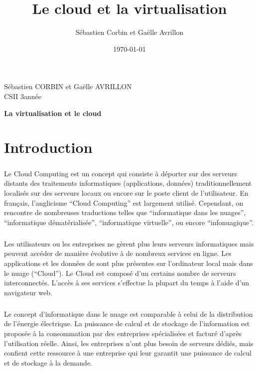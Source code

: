 \documentclass[a4paper,12pt]{report}
\title{Le cloud et la virtualisation}
\author{Sébastien Corbin et Gaëlle Avrillon}
\date{\today}
\begin{document}
\begin{onehalfspace}

		\begin{titlepage}
			\begin{center}
				Sébastien CORBIN et Gaëlle AVRILLON\\
				CSII 3\ieme année\\
			\end{center}
			\hrulefill
			\vspace{7cm}
			\begin{center} 
				\LARGE \textbf{La virtualisation et le cloud}\\
			\end{center}
		\end{titlepage}
		\newpage

		\setcounter{page}{1}
		\thispagestyle{empty}
		\newpage

	\chapter*{Introduction}
	
	\paragraph*{}
	Le Cloud Computing est un concept qui consiste à déporter sur des serveurs distants des traitements informatiques (applications, données) traditionnellement localisés sur des serveurs locaux ou encore sur le poste client de l’utilisateur. En français, l’anglicisme “Cloud Computing” est largement utilisé. Cependant, on rencontre de nombreuses traductions telles que “informatique dans les nuages”, “informatique dématérialisée”, “informatique virtuelle”, ou encore “infonuagique”.

	\paragraph*{}
	Les utilisateurs ou les entreprises ne gèrent plus leurs serveurs informatiques mais peuvent accéder de manière évolutive à de nombreux services en ligne. Les applications et les données de sont plus présentes sur l’ordinateur local mais dans le nuage (“Cloud”). Le Cloud est composé d’un certains nombre de serveurs interconnectés. L’accès à ses services s’effectue la plupart du temps à l’aide d’un navigateur web.
	
	\paragraph*{}
	Le concept d'informatique dans le nuage est comparable à celui de la distribution de l'énergie électrique. La puissance de calcul et de stockage de l'information est proposée à la consommation par des entreprises spécialisées et facturé d'après l'utilisation réelle. Ainsi, les entreprises n'ont plus besoin de serveurs dédiés, mais confient cette ressource à une entreprise qui leur garantit une puissance de calcul et de stockage à la demande.
	

\end{onehalfspace}
\end{document}
